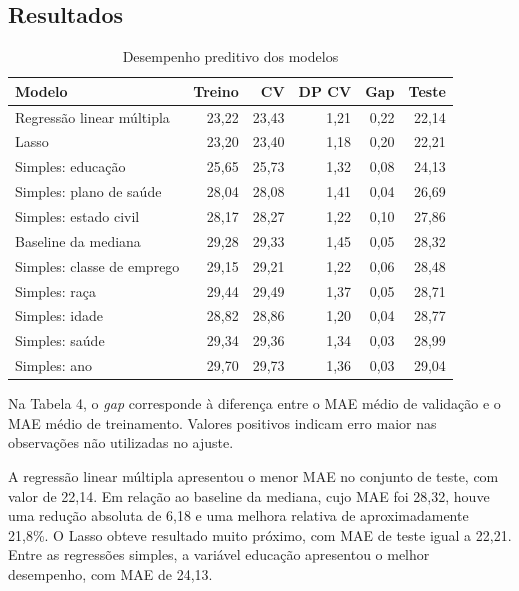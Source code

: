 \subsection{Resultados}

\begin{table}[H]
    \centering
    \small
    \caption{Desempenho preditivo dos modelos}
    \begin{tabular}{lrrrrr}
        \toprule
        \textbf{Modelo} & \textbf{Treino} & \textbf{CV} & \textbf{DP CV} & \textbf{Gap} & \textbf{Teste} \\
        \midrule
        Regressão linear múltipla & 23,22 & 23,43 & 1,21 & 0,22 & 22,14 \\
        Lasso & 23,20 & 23,40 & 1,18 & 0,20 & 22,21 \\
        Simples: educação & 25,65 & 25,73 & 1,32 & 0,08 & 24,13 \\
        Simples: plano de saúde & 28,04 & 28,08 & 1,41 & 0,04 & 26,69 \\
        Simples: estado civil & 28,17 & 28,27 & 1,22 & 0,10 & 27,86 \\
        Baseline da mediana & 29,28 & 29,33 & 1,45 & 0,05 & 28,32 \\
        Simples: classe de emprego & 29,15 & 29,21 & 1,22 & 0,06 & 28,48 \\
        Simples: raça & 29,44 & 29,49 & 1,37 & 0,05 & 28,71 \\
        Simples: idade & 28,82 & 28,86 & 1,20 & 0,04 & 28,77 \\
        Simples: saúde & 29,34 & 29,36 & 1,34 & 0,03 & 28,99 \\
        Simples: ano & 29,70 & 29,73 & 1,36 & 0,03 & 29,04 \\
        \bottomrule
    \end{tabular}
\end{table}

Na Tabela 4, o \textit{gap} corresponde à diferença entre o MAE médio de validação e o MAE médio de treinamento. Valores positivos indicam erro maior nas observações não utilizadas no ajuste.

A regressão linear múltipla apresentou o menor MAE no conjunto de teste, com valor de 22,14. Em relação ao baseline da mediana, cujo MAE foi 28,32, houve uma redução absoluta de 6,18 e uma melhora relativa de aproximadamente 21,8\%. O Lasso obteve resultado muito próximo, com MAE de teste igual a 22,21. Entre as regressões simples, a variável educação apresentou o melhor desempenho, com MAE de 24,13.

